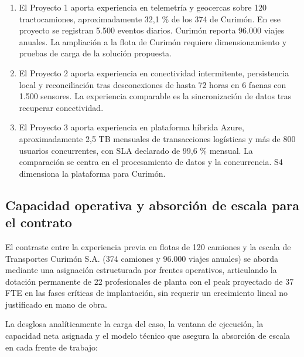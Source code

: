 \begin{enumerate}
  \item El Proyecto 1 aporta experiencia en telemetría y geocercas sobre 120 tractocamiones, aproximadamente 32,1 \% de los 374 de Curimón. En ese proyecto se registran 5.500 eventos diarios. Curimón reporta 96.000 viajes anuales. La ampliación a la flota de Curimón requiere dimensionamiento y pruebas de carga de la solución propuesta.
  \item El Proyecto 2 aporta experiencia en conectividad intermitente, persistencia local y reconciliación tras desconexiones de hasta 72 horas en 6 faenas con 1.500 sensores. La experiencia comparable es la sincronización de datos tras recuperar conectividad.
  \item El Proyecto 3 aporta experiencia en plataforma híbrida Azure, aproximadamente 2,5 TB mensuales de transacciones logísticas y más de 800 usuarios concurrentes, con SLA declarado de 99,6 \% mensual. La comparación se centra en el procesamiento de datos y la concurrencia. S4 dimensiona la plataforma para Curimón.
\end{enumerate}

\subsection{Capacidad operativa y absorción de escala para el contrato}\label{sec:1-capacidad-escala}

El contraste entre la experiencia previa en flotas de 120 camiones y la escala de Transportes Curimón S.A. (374 camiones y 96.000 viajes anuales) se aborda mediante una asignación estructurada por frentes operativos, articulando la dotación permanente de 22 profesionales de planta con el peak proyectado de 37 FTE en las fases críticas de implantación, sin requerir un crecimiento lineal no justificado en mano de obra.

La  desglosa analíticamente la carga del caso, la ventana de ejecución, la capacidad neta asignada y el modelo técnico que asegura la absorción de escala en cada frente de trabajo:

